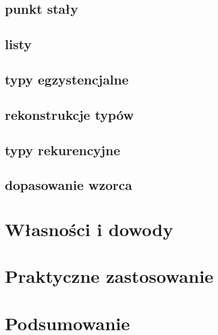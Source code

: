 \documentclass[11pt,leqno]{article}
\begin{document}
\subsection{punkt stały}
\subsection{listy}
\subsection{typy egzystencjalne}
\subsection{rekonstrukcje typów}
\subsection{typy rekurencyjne}
\subsection{dopasowanie wzorca}


\section{Własności i dowody}
\setcounter{equation}{0}



\section{Praktyczne zastosowanie}                       
\setcounter{equation}{0}


\section{Podsumowanie}                       
\setcounter{equation}{0}
\end{document}
